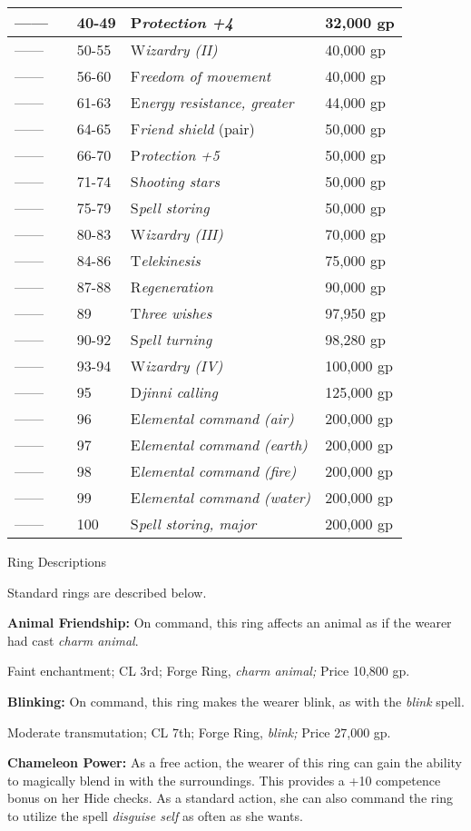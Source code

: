 \documentclass{article}
\begin{document}
\begin{tabular}{|>{\raggedright}p{34pt}|>{\raggedright}p{40pt}|>{\raggedright}p{31pt}|>{\raggedright}p{117pt}|>{\raggedright}p{60pt}|}
\hline
------ &  & 40-49 & P\textit{rotection +4} & 32,000 gp\tabularnewline
\hline
------ &  & 50-55 & W\textit{izardry (II)} & 40,000 gp\tabularnewline
\hline
------ &  & 56-60 & F\textit{reedom of movement} & 40,000 gp\tabularnewline
\hline
------ &  & 61-63 & E\textit{nergy resistance, greater} & 44,000 gp\tabularnewline
\hline
------ &  & 64-65 & F\textit{riend shield }(pair) & 50,000 gp\tabularnewline
\hline
------ &  & 66-70 & P\textit{rotection +5} & 50,000 gp\tabularnewline
\hline
------ &  & 71-74 & S\textit{hooting stars} & 50,000 gp\tabularnewline
\hline
------ &  & 75-79 & S\textit{pell storing} & 50,000 gp\tabularnewline
\hline
------ &  & 80-83 & W\textit{izardry (III)} & 70,000 gp\tabularnewline
\hline
------ &  & 84-86 & T\textit{elekinesis} & 75,000 gp\tabularnewline
\hline
------ &  & 87-88 & R\textit{egeneration} & 90,000 gp\tabularnewline
\hline
------ &  & 89 & T\textit{hree wishes} & 97,950 gp\tabularnewline
\hline
------ &  & 90-92 & S\textit{pell turning} & 98,280 gp\tabularnewline
\hline
------ &  & 93-94 & W\textit{izardry (IV)} & 100,000 gp\tabularnewline
\hline
------ &  & 95 & D\textit{jinni calling} & 125,000 gp\tabularnewline
\hline
------ &  & 96 & E\textit{lemental command (air)} & 200,000 gp\tabularnewline
\hline
------ &  & 97 & E\textit{lemental command (earth)} & 200,000 gp\tabularnewline
\hline
------ &  & 98 & E\textit{lemental command (fire)} & 200,000 gp\tabularnewline
\hline
------ &  & 99 & E\textit{lemental command (water)} & 200,000 gp\tabularnewline
\hline
------ &  & 100 & S\textit{pell storing, major} & 200,000 gp\tabularnewline
\hline
\end{tabular}

\vspace{12pt}
Ring Descriptions

Standard rings are described below.

\textbf{Animal Friendship:} On command, this ring affects an animal as if the wearer 
had cast \textit{charm animal}.

Faint enchantment; CL 3rd; Forge Ring, \textit{charm animal; }Price 10,800 gp.

\textbf{Blinking: }On command, this ring makes the wearer blink, as with the \textit{blink 
}spell.

Moderate transmutation; CL 7th; Forge Ring, \textit{blink; }Price 27,000 gp.

\textbf{Chameleon Power: }As a free action, the wearer of this ring can gain the 
ability to magically blend in with the surroundings. This provides a +10 competence 
bonus on her Hide checks. As a standard action, she can also command the ring to 
utilize the spell \textit{disguise self }as often as she wants.
\end{document}
